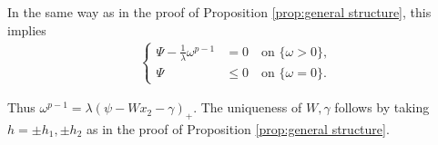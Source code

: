 \documentclass[11pt,letterpaper]{amsart}
\theoremstyle{definition}
\theoremstyle{remark}
\numberwithin{equation}{section}
\begin{document}
In the same way as in the proof of Proposition \ref{prop:general structure}, this implies 
\begin{align}
    \left\{\begin{aligned}
    \Psi - \frac{1}{\lambda}\omega^{p-1} & = 0 \quad \text{on } \{\omega > 0\}, \\
    \Psi & \leq 0 \quad \text{on } \{ \omega =0\}.
    \end{aligned}\right.
    \label{eqn:Psi and omega passing delta to 0 with L1}
\end{align}

Thus $\omega^{p-1} = \lambda(\psi -W x_{2} - \gamma)_+$. The uniqueness of $W,\gamma$ follows by taking $h=\pm h_1,\pm h_2$ as in the proof of Proposition \ref{prop:general structure}. 

\rightline{$\Box$}




\end{document}
